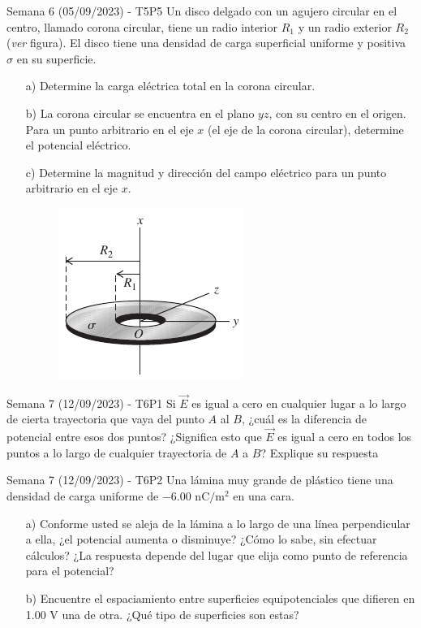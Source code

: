 \begin{frame}{Semana 6 (05/09/2023) - T5P5}
    \small
    Un disco delgado con un agujero circular en el centro, llamado corona circular, tiene un radio interior $R_1$ y un radio exterior $R_2$ (\textit{ver} figura). El disco tiene una densidad de carga superficial uniforme y positiva $\sigma$ en su superficie.

\begin{itemize}
    \item[a)] Determine la carga
eléctrica total en la corona circular.
\item[b)] La corona circular se encuentra
en el plano $yz$, con su centro en el
origen. Para un punto arbitrario en
el eje $x$ (el eje de la corona circular), determine el potencial eléctrico.
\item[c)] Determine la magnitud y dirección del campo eléctrico para un punto arbitrario en
el eje $x$.

\begin{figure}[H]
        \centering
        \includegraphics[scale=0.4]{figures/corona.png}
    \end{figure}

\end{itemize}
    
\end{frame}

\begin{frame}{Semana 7 (12/09/2023) - T6P1}
    Si $\vec{E}$ es igual a cero en cualquier lugar a lo largo de cierta trayectoria que vaya del punto $A$ al $B$, ¿cuál es la diferencia de potencial entre esos dos puntos? ¿Significa esto que $\vec{E}$ es igual a cero en todos los puntos a lo largo de cualquier trayectoria de $A$ a $B$? Explique su respuesta
\end{frame}

\begin{frame}{Semana 7 (12/09/2023) - T6P2}
    Una lámina muy grande de plástico tiene una densidad de carga uniforme de $-6.00\text{ nC}/\text{m}^2$ en una cara.
    
    \begin{itemize}
        \item[a)] Conforme usted se aleja de la lámina a lo largo de una línea perpendicular a ella, ¿el potencial aumenta o disminuye? ¿Cómo lo sabe, sin efectuar cálculos? ¿La respuesta depende del lugar que elija como punto de referencia para el potencial?
        \item[b)] Encuentre el espaciamiento entre superficies equipotenciales que difieren en 1.00 V una de otra. ¿Qué tipo de superficies son estas? 
    \end{itemize}
\end{frame}

